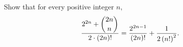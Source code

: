 Show that for every positive integer $n$,
\[\dfrac{2^{2n}+\dbinom{2n}{n}}{2\cdot(2n)!}=\dfrac{2^{2n-1}}{(2n)!}+\dfrac{1}{2\left(n!\right)^2}.\]
